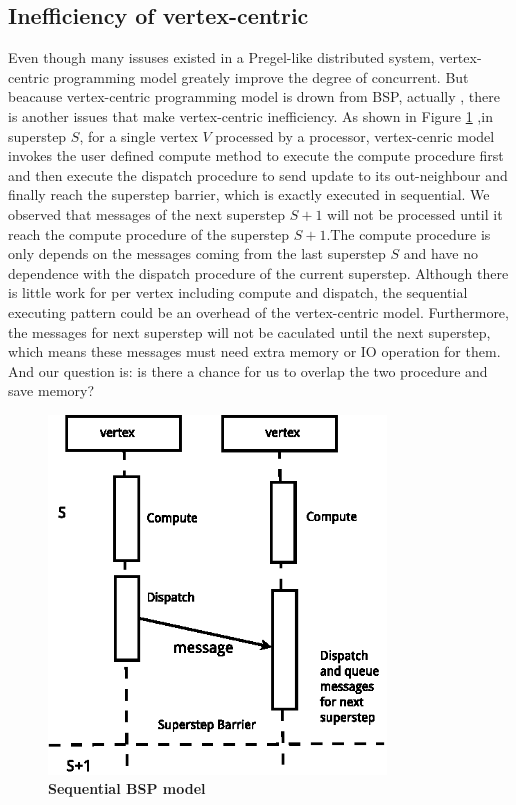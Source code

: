 \documentclass[twocolumn,a4paper,10pt]{article}
\begin{document}
\subsection{Inefficiency of vertex-centric}

Even though many issuses existed in a Pregel-like distributed system, vertex-centric programming model greately improve the degree of concurrent. But beacause vertex-centric programming model is drown from BSP, actually , there is another issues that make vertex-centric inefficiency. As shown in Figure \ref{figure:sequentialbsp} ,in superstep $S$, for a single vertex $V$ processed by a processor, vertex-cenric model invokes the user defined compute method to execute the compute procedure first and then execute the dispatch procedure to send update to its out-neighbour and finally reach the superstep barrier, which is exactly executed in sequential. We observed that messages of the next superstep $S+1$ will not be processed until it reach the compute procedure of the superstep $S+1$.The compute procedure is only depends on the messages coming from the last superstep $S$ and have no dependence with the dispatch procedure of the current superstep. Although there is little work for per vertex including compute and dispatch, the sequential executing pattern could be an overhead of the vertex-centric model. Furthermore, the messages for next superstep will not be caculated until the next superstep, which means these messages must need extra memory or IO operation for them. And our question is: is there a chance for us to overlap the two procedure and save memory?

\begin{figure}[!htbp]

\begin{minipage}[]{0.5\textwidth}
	\centering
     \includegraphics[width=0.8\textwidth,angle=0]{figure/sequentialbsp_new.eps}
\end{minipage}
    \caption{\textbf{Sequential BSP model}}
    \label{figure:sequentialbsp}
\end{figure}
\end{document}
